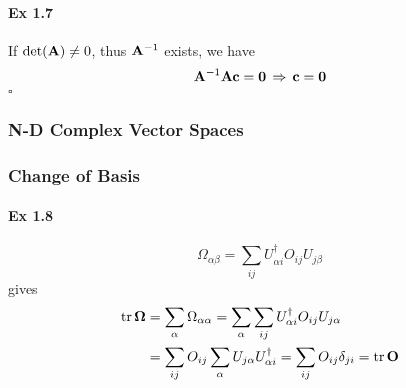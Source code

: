 \documentclass[a4paper]{article}
\DeclareMathOperator{\dra}{\Rightarrow}
\newcommand{\ex}[1]{\paragraph{Ex #1}}
\numberwithin{equation}{subsection}
\begin{document}
\ex{1.7}
If $ \det(\vb{A}) \neq 0 $, thus $ \vb{A}^{-1} $ exists, we have
\begin{equation}\label{key}
\vb{A}^{-1}\vb{A}\vb{c} = \bm{0} \;\dra\; \vb{c} = \bm{0}
\end{equation}
$  \square $

\subsubsection{N-D Complex Vector Spaces}

\subsubsection{Change of Basis}
\ex{1.8}
\begin{equation}\label{key}
\Omega_{\alpha\beta} = \sum_{ij} U_{\alpha i}^\dagger O_{ij} U_{j\beta}
\end{equation}
gives
\begin{equation}\label{key}
\begin{aligned}
\tr\bm\Omega &= \sum_\alpha \Omega_{\alpha\alpha} = \sum_\alpha \sum_{ij} U_{\alpha i}^\dagger O_{ij} U_{j\alpha}\\
&= \sum_{ij} O_{ij} \sum_\alpha U_{j\alpha} U_{\alpha i}^\dagger = \sum_{ij} O_{ij} \delta_{ji} = \tr\vb{O}
\end{aligned}
\end{equation}
\end{document}
